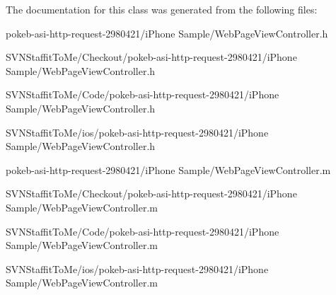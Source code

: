 \-The documentation for this class was generated from the following files\-:\begin{DoxyCompactItemize}
\item 
pokeb-\/asi-\/http-\/request-\/2980421/i\-Phone Sample/\-Web\-Page\-View\-Controller.\-h\item 
\-S\-V\-N\-Staffit\-To\-Me/\-Checkout/pokeb-\/asi-\/http-\/request-\/2980421/i\-Phone Sample/\-Web\-Page\-View\-Controller.\-h\item 
\-S\-V\-N\-Staffit\-To\-Me/\-Code/pokeb-\/asi-\/http-\/request-\/2980421/i\-Phone Sample/\-Web\-Page\-View\-Controller.\-h\item 
\-S\-V\-N\-Staffit\-To\-Me/ios/pokeb-\/asi-\/http-\/request-\/2980421/i\-Phone Sample/\-Web\-Page\-View\-Controller.\-h\item 
pokeb-\/asi-\/http-\/request-\/2980421/i\-Phone Sample/\-Web\-Page\-View\-Controller.\-m\item 
\-S\-V\-N\-Staffit\-To\-Me/\-Checkout/pokeb-\/asi-\/http-\/request-\/2980421/i\-Phone Sample/\-Web\-Page\-View\-Controller.\-m\item 
\-S\-V\-N\-Staffit\-To\-Me/\-Code/pokeb-\/asi-\/http-\/request-\/2980421/i\-Phone Sample/\-Web\-Page\-View\-Controller.\-m\item 
\-S\-V\-N\-Staffit\-To\-Me/ios/pokeb-\/asi-\/http-\/request-\/2980421/i\-Phone Sample/\-Web\-Page\-View\-Controller.\-m\end{DoxyCompactItemize}
